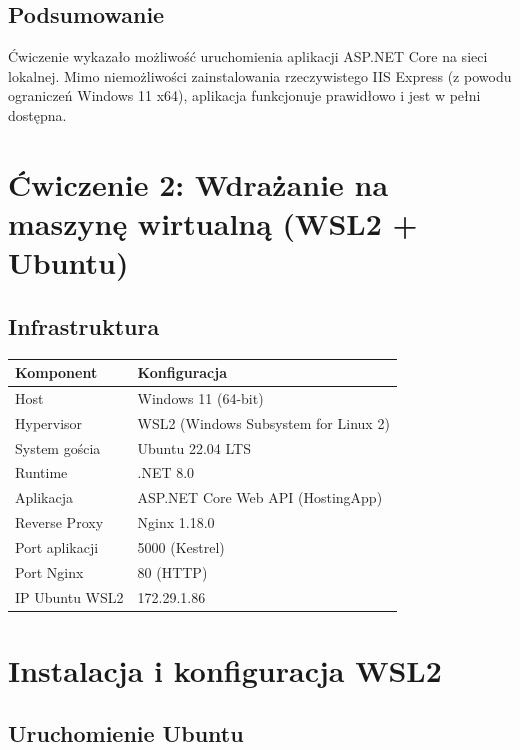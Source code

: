 \documentclass[twoside]{article}
\begin{document}
\subsection{Podsumowanie}

Ćwiczenie wykazało możliwość uruchomienia aplikacji ASP.NET Core na sieci lokalnej. Mimo niemożliwości zainstalowania rzeczywistego IIS Express (z powodu ograniczeń Windows 11 x64), aplikacja funkcjonuje prawidłowo i jest w pełni dostępna.

\section{Ćwiczenie 2: Wdrażanie na maszynę wirtualną (WSL2 + Ubuntu)}
\subsection{Infrastruktura}

\begin{table}[H]
	\centering
	\begin{tabular}{|l|l|}
		\hline
		\textbf{Komponent} & \textbf{Konfiguracja} \\
		\hline
		Host & Windows 11 (64-bit) \\
		\hline
		Hypervisor & WSL2 (Windows Subsystem for Linux 2) \\
		\hline
		System gościa & Ubuntu 22.04 LTS \\
		\hline
		Runtime & .NET 8.0 \\
		\hline
		Aplikacja & ASP.NET Core Web API (HostingApp) \\
		\hline
		Reverse Proxy & Nginx 1.18.0 \\
		\hline
		Port aplikacji & 5000 (Kestrel) \\
		\hline
		Port Nginx & 80 (HTTP) \\
		\hline
		IP Ubuntu WSL2 & 172.29.1.86 \\
		\hline
	\end{tabular}
\end{table}

\section{Instalacja i konfiguracja WSL2}

\subsection{Uruchomienie Ubuntu}
\end{document}

